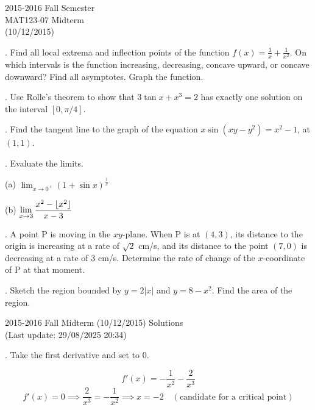 \documentclass{article}
\DeclarePairedDelimiter\floor{\lfloor}{\rfloor}
\begin{document}
\pagestyle{empty}
\large

\begin{center}
2015-2016 Fall Semester\\MAT123-07 Midterm\\(10/12/2015)
\end{center}

. Find all local extrema and inflection points of the function $f(x)=\frac{1}{x}+\frac{1}{x^2}$. On which intervals is the function increasing, decreasing, concave upward, or concave downward? Find all asymptotes. Graph the function.


\hfill

. Use Rolle's theorem to show that $3\tan x + x^3 = 2$ has exactly one solution on the interval $[0,\pi/4]$.

\hfill

. Find the tangent line to the graph of the equation $x\sin\left(xy-y^2\right)=x^2-1$, at $(1,1)$.

\hfill

. Evaluate the limits.

\hfill

(a) $\displaystyle\lim_{x\to 0^+}(1+\sin x)^{\frac{1}{x}}$

(b) $\displaystyle\lim_{x\to 3}\frac{x^2-\floor{x^2}}{x-3}$

\hfill

. A point P is moving in the $xy$-plane. When P is at $(4, 3)$, its distance to the origin is increasing at a rate of $\sqrt{2}$ cm/s, and its distance to the point $(7, 0)$ is decreasing at a rate of 3 cm/s. Determine the rate of change of the $x$-coordinate of P at that moment.

\hfill

. Sketch the region bounded by $y=2|x|$ and $y=8-x^2$. Find the area of the region.

\newpage

\begin{center}
2015-2016 Fall Midterm (10/12/2015) Solutions\\
(Last update: 29/08/2025 20:34)
\end{center}

. Take the first derivative and set to 0.

\[f'(x)=-\frac{1}{x^2}-\frac{2}{x^3}\]
\[f'(x)=0\implies \frac{2}{x^3} = -\frac{1}{x^2}\implies x = -2 \quad(\text{candidate for a critical point})\]

\hfill
\end{document}
